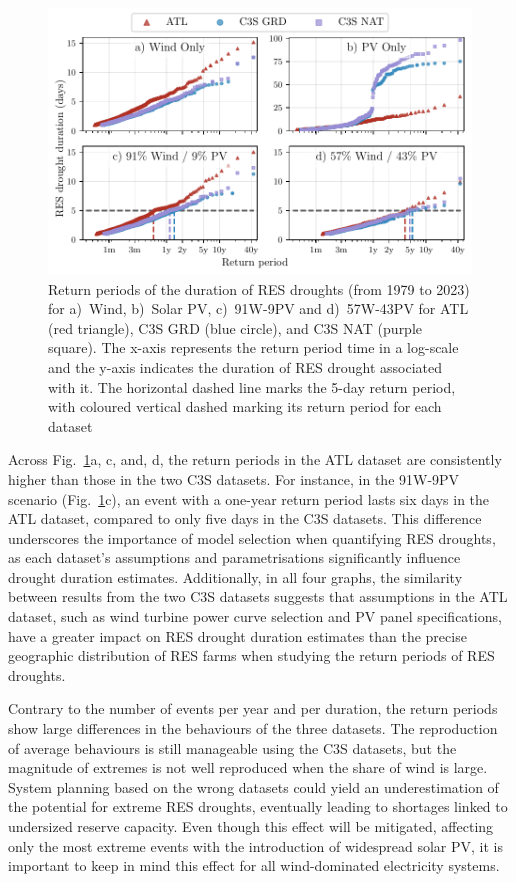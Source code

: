 \documentclass[preprint, 12pt]{elsarticle}
\begin{document}
\begin{figure}[!ht]
	\centering
	\includegraphics[width=\textwidth]{droughts_return_periods.pdf}
	\caption{Return periods of the duration of RES droughts  (from 1979 to 2023) for a)~Wind, b)~Solar PV, c)~91W-9PV and d)~57W-43PV for ATL (red triangle), C3S GRD (blue circle), and C3S NAT (purple square). The x-axis represents the return period time in a log-scale and the y-axis indicates the duration of RES drought associated with it. The horizontal dashed line marks the 5-day return period, with coloured vertical dashed marking its return period for each dataset}
	\label{fig:return_periods}
\end{figure}

Across Fig.~\ref{fig:return_periods}a, c, and, d, the return periods in the ATL dataset are consistently higher than those in the two C3S datasets. For instance, in the 91W-9PV scenario (Fig.~\ref{fig:return_periods}c), an event with a one-year return period lasts six days in the ATL dataset, compared to only five days in the C3S datasets. This difference underscores the importance of model selection when quantifying RES droughts, as each dataset’s assumptions and parametrisations significantly influence drought duration estimates. Additionally, in all four graphs, the similarity between results from the two C3S datasets suggests that assumptions in the ATL dataset, such as wind turbine power curve selection and PV panel specifications, have a greater impact on RES drought duration estimates than the precise geographic distribution of RES farms when studying the return periods of RES droughts.

Contrary to the number of events per year and per duration, the return periods show large differences in the behaviours of the three datasets. The reproduction of average behaviours is still manageable using the C3S datasets, but the magnitude of extremes is not well reproduced when the share of wind is large. System planning based on the wrong datasets could yield an underestimation of the potential for extreme RES droughts, eventually leading to shortages linked to undersized reserve capacity. Even though this effect will be mitigated, affecting only the most extreme events with the introduction of widespread solar PV, it is important to keep in mind this effect for all wind-dominated electricity systems.
\end{document}
